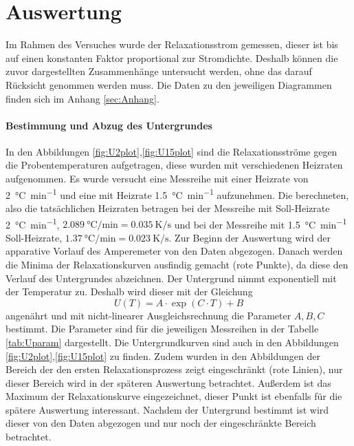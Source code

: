 \section{Auswertung} \label{sec:Auswertung}
Im Rahmen des Versuches wurde der Relaxationsstrom gemessen, dieser ist bis auf einen konstanten 
Faktor proportional zur Stromdichte. 
Deshalb können die zuvor dargestellten Zusammenhänge untersucht werden, 
ohne das darauf Rücksicht genommen werden muss. 
Die Daten zu den jeweiligen Diagrammen finden sich im Anhang \ref{sec:Anhang}.
\paragraph{Bestimmung und Abzug des Untergrundes}
In den Abbildungen \ref{fig:U2plot},\ref{fig:U15plot} sind die Relaxationsströme gegen die 
Probentemperaturen aufgetragen, diese wurden mit verschiedenen Heizraten aufgenommen. 
Es wurde versucht eine Messreihe mit einer Heizrate von \SI{2}{\celsius\per\minute} und eine 
mit Heizrate \SI{1.5}{\celsius\per\minute} aufzunehmen. 
Die berechneten, also die tatsächlichen Heizraten betragen 
bei der Messreihe mit Soll-Heizrate \SI{2}{\celsius\per\minute}, 
$\SI{2.089}{\celsius\per\minute} = \SI{0.035}{\kelvin\per\second}$ und bei der 
Messreihe mit \SI{1.5}{\celsius\per\minute} Soll-Heizrate, 
$\SI{1.37}{\celsius\per\minute} = \SI{0.023}{\kelvin\per\second}$. 
Zur Beginn der Auswertung wird der apparative Vorlauf des 
Amperemeter von den Daten abgezogen. Danach werden die Minima der Relaxationskurven ausfindig 
gemacht (rote Punkte), 
da diese den Verlauf des Untergrundes abzeichnen. Der Untergrund nimmt exponentiell mit 
der Temperatur zu. Deshalb wird dieser mit der Gleichung
\begin{equation}
U(T) = 	A\cdot \exp (C\cdot T ) + B 
\end{equation}
angenährt und mit nicht-linearer Ausgleichsrechnung die Parameter $A,B,C$ bestimmt. 
Die Parameter sind für die jeweiligen Messreihen in der Tabelle \ref{tab:Uparam} dargestellt. 
Die Untergrundkurven sind auch in den Abbildungen \ref{fig:U2plot},\ref{fig:U15plot} zu finden. 
Zudem wurden in den Abbildungen der Bereich der den ersten Relaxationsprozess zeigt eingeschränkt 
(rote Linien), nur dieser Bereich wird in der späteren Auswertung betrachtet. 
Außerdem ist das Maximum der 
Relaxationskurve eingezeichnet, dieser Punkt ist ebenfalls für die spätere Auswertung interessant.
Nachdem der Untergrund bestimmt ist wird dieser von den Daten abgezogen und nur noch der 
eingeschränkte Bereich betrachtet.

